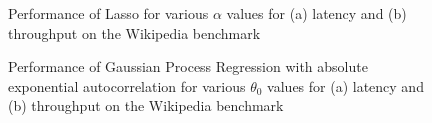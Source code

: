 \begin{figure}

\caption{Performance of Lasso for various $\alpha$ values for (a)
  latency and (b) throughput on the Wikipedia benchmark}
\label{fig:lasso_alphas}
\end{figure}

\begin{figure}

\caption{Performance of Gaussian Process Regression with absolute
  exponential autocorrelation for various $\theta_0$ values for (a)
  latency and (b) throughput on the Wikipedia benchmark}
\label{fig:gp_theta0s}
\end{figure}

